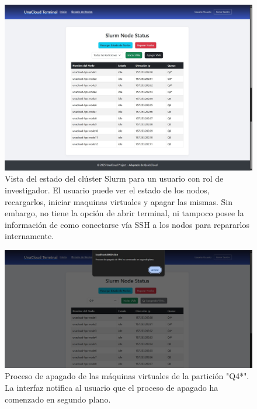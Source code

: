 \begin{figure}[H]
    \centering
    \includegraphics[width=0.75\linewidth]{Documento Final/Imagenes/NodosUser.jpg}
    \caption{Vista del estado del clúster Slurm para un usuario con rol de investigador. El usuario puede ver el estado de los nodos, recargarlos, iniciar maquinas virtuales y apagar las mismas. Sin embargo, no tiene la opción de abrir terminal, ni tampoco posee la información de como conectarse vía SSH a los nodos para repararlos internamente.}
    \label{fig:UCUser}
\end{figure}

\begin{figure}[H]
    \centering
    \includegraphics[width=0.75\linewidth]{Documento Final/Imagenes/ApagarNodosQ4.jpg}
    \caption{Proceso de apagado de las máquinas virtuales de la partición "Q4*". La interfaz notifica al usuario que el proceso de apagado ha comenzado en segundo plano.}
    \label{fig:NodeAdmin}
\end{figure}

